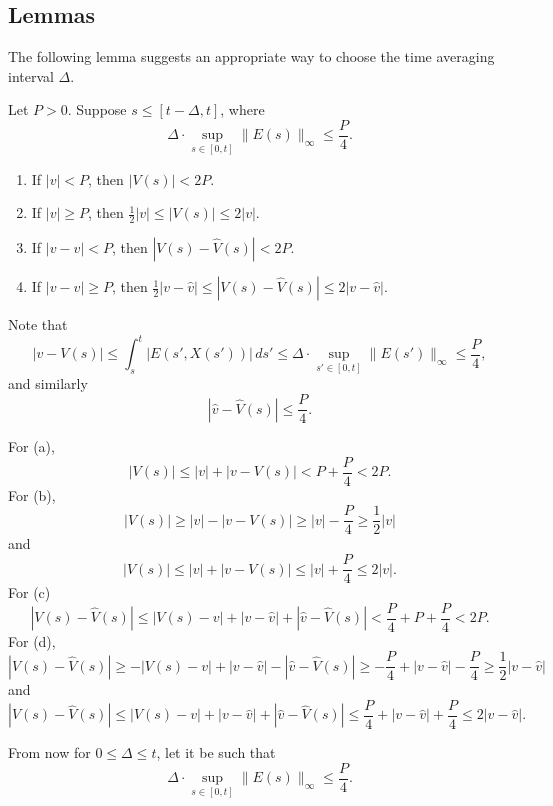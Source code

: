 \documentclass[11pt]{amsart}
\begin{document}
\subsection{Lemmas}
The following lemma suggests an appropriate way to choose the time averaging interval $\Delta$.
\begin{lem}
Let $P>0$.
Suppose $s\le[t-\Delta,t]$, where
\[\Delta\cdot\sup_{s\in[0,t]}\|E(s)\|_\infty\le\frac P4.\]
\begin{enumerate}
\item If $|v|<P$, then $|V(s)|<2P$.
\item If $|v|\ge P$, then $\frac12|v|\le|V(s)|\le2|v|$. 
\item If $|v-\hat v|<P$, then $|V(s)-\hat V(s)|<2P$.
\item If $|v-\hat v|\ge P$, then $\frac12|v-\hat v|\le|V(s)-\hat V(s)|\le2|v-\hat v|$.
\end{enumerate}
\end{lem}
\begin{pf}
Note that
\[|v-V(s)|\le\int_s^t|E(s',X(s'))|\,ds'\le\Delta\cdot\sup_{s'\in[0,t]}\|E(s')\|_\infty\le\frac P4,\]
and similarly
\[|\hat v-\hat V(s)|\le\frac P4.\]

For (a),
\[|V(s)|\le|v|+|v-V(s)|<P+\frac P4<2P.\]
For (b),
\[|V(s)|\ge|v|-|v-V(s)|\ge|v|-\frac P4\ge\frac12|v|\]
and
\[|V(s)|\le|v|+|v-V(s)|\le|v|+\frac P4\le2|v|.\]
For (c)
\[|V(s)-\hat V(s)|\le|V(s)-v|+|v-\hat v|+|\hat v-\hat V(s)|<\frac P4+P+\frac P4<2P.\]
For (d),
\[|V(s)-\hat V(s)|\ge-|V(s)-v|+|v-\hat v|-|\hat v-\hat V(s)|\ge-\frac P4+|v-\hat v|-\frac P4\ge\frac12|v-\hat v|\]
and
\[|V(s)-\hat V(s)|\le|V(s)-v|+|v-\hat v|+|\hat v-\hat V(s)|\le\frac P4+|v-\hat v|+\frac P4\le2|v-\hat v|.\]
\end{pf}


From now for $0\le\Delta\le t$, let it be such that
\[\Delta\cdot\sup_{s\in[0,t]}\|E(s)\|_\infty\le\frac P4.\]
\end{document}
